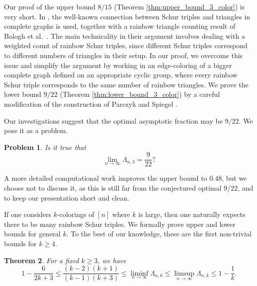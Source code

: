 \documentclass[11pt]{article}
\theoremstyle{plain}
\newtheorem{theorem}{Theorem}[section]
\newtheorem{problem}[theorem]{Problem}
\numberwithin{equation}{section}
\begin{document}
Our proof of the upper bound $8/15$ (Theorem \ref{thm:upper_bound_3_color}) is very short. In \cite{Parczyk_Spiegel_2026}, the well-known connection between Schur triples and triangles in complete graphs is used, together with a rainbow triangle counting result of Balogh et al.~\cite{Balogh_Hu_Lidicky_Pfender_Volec_Young_2017}. The main technicality in their argument involves dealing with a weighted count of rainbow Schur triples, since different Schur triples correspond to different numbers of triangles in their setup. In our proof, we overcome this issue and simplify the argument by working in an edge-coloring of a bigger complete graph defined on an appropriate cyclic group, where every rainbow Schur triple corresponds to the same number of rainbow triangles. We prove the lower bound $9/22$ (Theorem \ref{thm:lower_bound_3_color}) by a careful modification of the construction of Parczyk and Spiegel \cite{Parczyk_Spiegel_2026}.

Our investigations suggest that the optimal asymptotic fraction may be $9/22$. We pose it as a problem.

\begin{problem} Is it true that 
\[ \lim_{n\to \infty} \Lambda_{n,3} = \frac{9}{22}?\]
\end{problem}

A more detailed computational work improves the upper bound to $0.48$, but we choose not to discuss it, as this is still far from the conjectured optimal $9/22$, and to keep our presentation short and clean.

If one considers $k$-colorings of $[n]$ where $k$ is large, then one naturally expects there to be many rainbow Schur triples. We formally prove upper and lower bounds for general $k$. To the best of our knowledge, these are the first non-trivial bounds for $k\geq 4$. 

\begin{theorem}\label{thm:general_lower_upper_bound} For a fixed $k\ge 3$, we have 
\[ 1-\frac{6}{2k+3}\le \frac{(k-2)(k+1)}{(k-1)(k+3)}\le \liminf_{n\to \infty} \Lambda_{n,k}\le \limsup_{n\to \infty} \Lambda_{n,k}\le 1-\frac{1}{k}.\]
\end{theorem}
\end{document}
